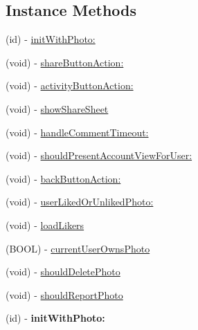 \subsection*{Instance Methods}
\begin{DoxyCompactItemize}
\item 
(id) -\/ \hyperlink{interface_e_s_photo_details_view_controller_aaf672e8a1a068be5452fd8d342936bf8}{init\+With\+Photo\+:}
\item 
(void) -\/ \hyperlink{interface_e_s_photo_details_view_controller_aa8b40af3a9245288cb12263f4a8b13ae}{share\+Button\+Action\+:}
\item 
(void) -\/ \hyperlink{interface_e_s_photo_details_view_controller_a7ecd71e49e916a526bef700a53518fec}{activity\+Button\+Action\+:}
\item 
(void) -\/ \hyperlink{interface_e_s_photo_details_view_controller_a44e7cf90cd0a5dc5375227b1b82f8718}{show\+Share\+Sheet}
\item 
(void) -\/ \hyperlink{interface_e_s_photo_details_view_controller_a114348249e1fd79d330472f6968744ed}{handle\+Comment\+Timeout\+:}
\item 
(void) -\/ \hyperlink{interface_e_s_photo_details_view_controller_aa7aa6e9ed71b4e616073aebf427edb3e}{should\+Present\+Account\+View\+For\+User\+:}
\item 
(void) -\/ \hyperlink{interface_e_s_photo_details_view_controller_a127786d5bb3154b7fbfd65830c6e1dd5}{back\+Button\+Action\+:}
\item 
(void) -\/ \hyperlink{interface_e_s_photo_details_view_controller_a7c4240af748b42d4e6bb524d178667b3}{user\+Liked\+Or\+Unliked\+Photo\+:}
\item 
(void) -\/ \hyperlink{interface_e_s_photo_details_view_controller_ab5e636f4fb05f81ebe46190ccddfea9a}{load\+Likers}
\item 
(B\+O\+O\+L) -\/ \hyperlink{interface_e_s_photo_details_view_controller_a2db4f21f0402d2b4b7da03324c8bdde9}{current\+User\+Owns\+Photo}
\item 
(void) -\/ \hyperlink{interface_e_s_photo_details_view_controller_ab48676001aca604b49fece73bd548140}{should\+Delete\+Photo}
\item 
(void) -\/ \hyperlink{interface_e_s_photo_details_view_controller_a7c754508b57e7668d5cdf6147785a0b4}{should\+Report\+Photo}
\item 
\hypertarget{interface_e_s_photo_details_view_controller_aaf672e8a1a068be5452fd8d342936bf8}{}(id) -\/ {\bfseries init\+With\+Photo\+:}\label{interface_e_s_photo_details_view_controller_aaf672e8a1a068be5452fd8d342936bf8}

\end{DoxyCompactItemize}

